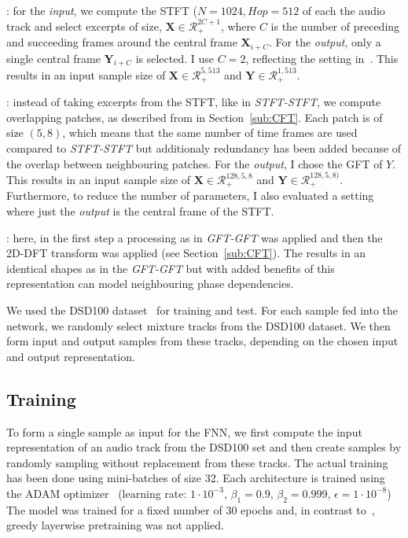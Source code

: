 \begin{description}[style=unboxed,leftmargin=0cm]
\item[STFT-STFT]: for the \emph{input}, we compute the STFT (\(N=1024, Hop=512\) of each the audio track and select excerpts of size, \(\mathbf{X} \in \mathcal{R}^{2C + 1}_{+} \), where \(C\) is the number of preceding and succeeding frames around the central frame \(\mathbf{X}_{i+C}\). For the \emph{output}, only a single central frame \(\mathbf{Y}_{i+C}\) is selected.
I use \(C=2\), reflecting the setting in~\cite{uhlich15}. This results in an input sample size of \(\mathbf{X} \in \mathcal{R}_{+}^{5, 513}\) and  \(\mathbf{Y} \in \mathcal{R}_{+}^{1, 513}\).

\item[GFT-GFT/GFT-STFT]: instead of taking excerpts from the STFT, like in \emph{STFT-STFT}, we compute overlapping patches, as described from in Section~\ref{sub:CFT}. Each patch is of size \((5, 8)\), which means that the same number of time frames are used compared to \emph{STFT-STFT} but additionaly redundancy has been added because of the overlap between neighbouring patches.
For the \emph{output}, I chose the GFT of \(Y\).
This results in an input sample size of \(\mathbf{X} \in \mathcal{R}_{+}^{128, 5, 8}\) and  \(\mathbf{Y} \in \mathcal{R}_{+}^{128, 5, 8)}\).
Furthermore, to reduce the number of parameters, I also evaluated a setting where just the \emph{output} is the central frame of the STFT.

\item[CFT-CFT/CFT-STFT]: here, in the first step a processing as in \emph{GFT-GFT} was applied and then the 2D-DFT transform was applied (see Section~\ref{sub:CFT}).
The results in an identical shapes as in the \emph{GFT-GFT} but with added benefits of this representation can model neighbouring phase dependencies.
\end{description}

We used the DSD100 dataset~\cite{ono15} for training and test. For each sample fed into the network, we randomly select mixture tracks from the DSD100 dataset.
We then form input and output samples from these tracks, depending on the chosen input and output representation.

\subsection{Training}

To form a single sample as input for the FNN, we first compute the input representation of an audio track from the DSD100 set and then create samples by randomly sampling without replacement from these tracks.
The actual training has been done using mini-batches of size 32.
Each architecture is trained using the ADAM optimizer~\cite{kingma14} (learning rate: \(1 \cdot 10^{-3}\), \(\beta_1=0.9\), \(\beta_2=0.999\), \(\epsilon=1 \cdot 10^{-8}\))
The model was trained for a fixed number of 30 epochs and, in contrast to~\cite{uhlich15}, greedy layerwise pretraining was not applied.


